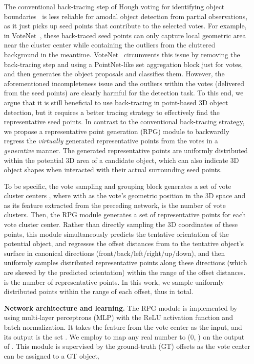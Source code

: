 \documentclass[final]{cvpr}
\begin{document}
The conventional back-tracing step of Hough voting for identifying object boundaries~\cite{robust-hough} is less reliable for amodal object detection from partial observations, as it just picks up seed points that contribute to the selected votes.
For example, in VoteNet~\cite{votenet}, these back-traced seed points can only capture local geometric area near the cluster center while containing the outliers from the cluttered background in the meantime.
VoteNet~\cite{votenet} circumvents this issue by removing the back-tracing step and using a PointNet-like set aggregation block just for votes, and then generates the object proposals and classifies them.
However, the aforementioned incompleteness issue and the outliers within the votes (delivered from the seed points) are clearly harmful for the detection task.
To this end, we argue that it is still beneficial to use back-tracing in point-based 3D object detection, but it requires a better tracing strategy to effectively find the representative seed points.
In contrast to the conventional back-tracing strategy, we propose a representative point generation (RPG) module to backwardly regress the \emph{virtually} generated representative points from the votes in a \emph{generative} manner.
The generated representative points are uniformly distributed within the potential 3D area of a candidate object, which can also indicate 3D object shapes when interacted with their actual surrounding seed points.

To be specific, the vote sampling and grouping block generates a set of vote cluster centers , where  with  as the vote's geometric position in the 3D space and  as its feature extracted from the preceding network,  is the number of vote clusters.
Then, the RPG module generates a set of representative points for each vote cluster center.
Rather than directly sampling the 3D coordinates of these points, this module simultaneously predicts the tentative orientation  of the potential object, and regresses the offset distances  from  to the tentative object's surface in  canonical directions (\ie front/back/left/right/up/down), and then uniformly samples distributed representative points  along these directions (which are skewed by the predicted orientation) within the range of the offset distances.
 is the number of representative points.
In this work, we sample  uniformly distributed points within the range of each offset, thus  in total.


\vspace{+1mm}
\noindent\textbf{Network architecture and learning.}
The RPG module is implemented by using multi-layer perceptrons (MLP) with the ReLU activation function and batch normalization.
It takes the feature  from the vote center  as the input, and its output is the set .
We employ  to map any real number to (0, ) on the output of .
This module is supervised by the ground-truth (GT) offsets as the vote center can be assigned to a GT object, \ie
\end{document}
